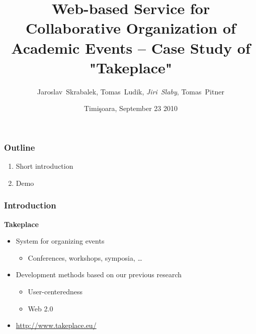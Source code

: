 \documentclass[xcolor=dvipsnames,handout]{beamer}
\title[Takeplace] %
{Web-based Service for Collaborative Organization of Academic Events -- Case
Study of "Takeplace"}
\author[J. Slaby]{Jaroslav~Skrabalek, Tomas~Ludik, \emph{Jiri~Slaby},
  Tomas~Pitner}
\institute[FI] %
{Faculty of Informatics, Masaryk University\\ Brno, Czech Republic}
\date[9/23/2010, Timi\c{s}oara]{Timi\c{s}oara, September 23 2010}
\newcommand{\heading}[1]{\textbf{\textcolor{BurntOrange}{#1}}}
\begin{document}
\begin{frame}
  \titlepage
\end{frame}


\begin{frame}
  \frametitle{Outline}
  \begin{enumerate}
  \item Short introduction 
  \item Demo
  \end{enumerate}
\end{frame}

\begin{frame}
  \frametitle{Introduction}
  \heading{Takeplace}
  \begin{itemize}
  \item System for organizing events
  \begin{itemize}
  \item Conferences, workshops, symposia, \ldots
  \end{itemize}
  \item Development methods based on our previous research
  \begin{itemize}
  \item User-centeredness
  \item Web 2.0
  \end{itemize}
  \item \url{http://www.takeplace.eu/}
  \end{itemize}
\end{frame}
\end{document}
